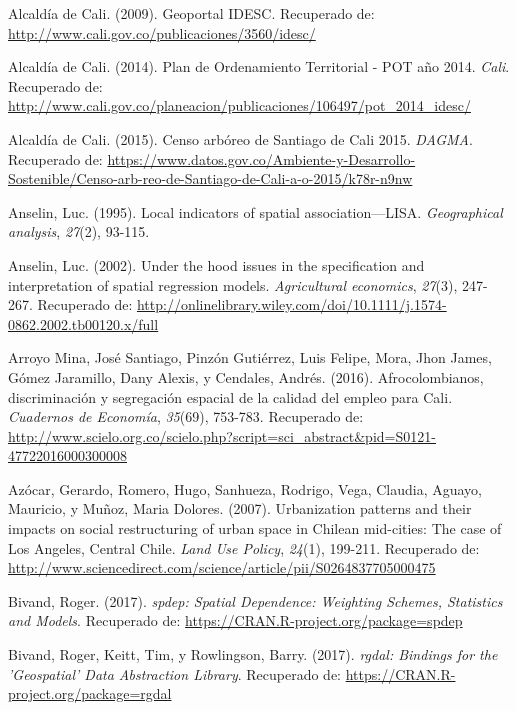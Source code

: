 \documentclass[12pt,a4paper,openany]{book}
\theoremstyle{definition}
\theoremstyle{definition}
\theoremstyle{definition}
\theoremstyle{remark}
\begin{document}
\hypertarget{ref-geoportal_idesc}{}
Alcaldía de Cali. (2009). Geoportal IDESC. Recuperado de:
\url{http://www.cali.gov.co/publicaciones/3560/idesc/}

\hypertarget{ref-pot2014cali}{}
Alcaldía de Cali. (2014). Plan de Ordenamiento Territorial - POT año
2014. \emph{Cali}. Recuperado de:
\url{http://www.cali.gov.co/planeacion/publicaciones/106497/pot_2014_idesc/}

\hypertarget{ref-ca2015cali}{}
Alcaldía de Cali. (2015). Censo arbóreo de Santiago de Cali 2015.
\emph{DAGMA}. Recuperado de:
\url{https://www.datos.gov.co/Ambiente-y-Desarrollo-Sostenible/Censo-arb-reo-de-Santiago-de-Cali-a-o-2015/k78r-n9nw}

\hypertarget{ref-anselin1995local}{}
Anselin, Luc. (1995). Local indicators of spatial association---LISA.
\emph{Geographical analysis}, \emph{27}(2), 93-115.

\hypertarget{ref-anselin_under_2002}{}
Anselin, Luc. (2002). Under the hood issues in the specification and
interpretation of spatial regression models. \emph{Agricultural
economics}, \emph{27}(3), 247-267. Recuperado de:
\url{http://onlinelibrary.wiley.com/doi/10.1111/j.1574-0862.2002.tb00120.x/full}

\hypertarget{ref-arroyo_mina_afrocolombianos_2016}{}
Arroyo Mina, José Santiago, Pinzón Gutiérrez, Luis Felipe, Mora, Jhon
James, Gómez Jaramillo, Dany Alexis, y Cendales, Andrés. (2016).
Afrocolombianos, discriminación y segregación espacial de la calidad del
empleo para Cali. \emph{Cuadernos de Economía}, \emph{35}(69), 753-783.
Recuperado de:
\url{http://www.scielo.org.co/scielo.php?script=sci_abstract\&pid=S0121-47722016000300008}

\hypertarget{ref-azocar_urbanization_2007}{}
Azócar, Gerardo, Romero, Hugo, Sanhueza, Rodrigo, Vega, Claudia, Aguayo,
Mauricio, y Muñoz, Maria Dolores. (2007). Urbanization patterns and
their impacts on social restructuring of urban space in Chilean
mid-cities: The case of Los Angeles, Central Chile. \emph{Land Use
Policy}, \emph{24}(1), 199-211. Recuperado de:
\url{http://www.sciencedirect.com/science/article/pii/S0264837705000475}

\hypertarget{ref-R-spdep}{}
Bivand, Roger. (2017). \emph{spdep: Spatial Dependence: Weighting
Schemes, Statistics and Models}. Recuperado de:
\url{https://CRAN.R-project.org/package=spdep}

\hypertarget{ref-R-rgdal}{}
Bivand, Roger, Keitt, Tim, y Rowlingson, Barry. (2017). \emph{rgdal:
Bindings for the 'Geospatial' Data Abstraction Library}. Recuperado de:
\url{https://CRAN.R-project.org/package=rgdal}
\end{document}
